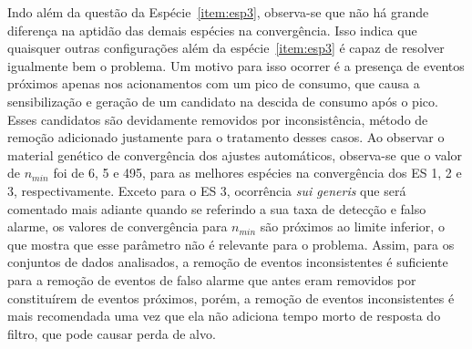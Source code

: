 Indo além da questão da Espécie~\ref{item:esp3}, observa-se que não há
grande diferença na aptidão das demais espécies na convergência. Isso
indica que quaisquer outras configurações além da
espécie~\ref{item:esp3} é capaz de resolver igualmente bem o problema.
Um motivo para isso ocorrer é a presença de eventos próximos apenas
nos acionamentos com um pico de consumo, que causa a sensibilização e
geração de um candidato na descida de consumo após o pico. Esses
candidatos são devidamente removidos por inconsistência, método de
remoção adicionado justamente para o tratamento desses casos. Ao
observar o material genético de convergência dos ajustes automáticos,
observa-se que o valor de $n_{min}$ foi de 6, 5 e 495, para as
melhores espécies na convergência dos ES 1, 2
e 3, respectivamente. Exceto para o ES 3,
ocorrência \emph{sui generis} que será comentado mais adiante quando
se referindo a sua taxa de detecção e falso alarme, os valores de
convergência para $n_{min}$ são próximos ao limite inferior, o que
mostra que esse parâmetro não é relevante para o problema. Assim, para
os conjuntos de dados analisados, a remoção de eventos inconsistentes
é suficiente para a remoção de eventos de falso alarme que antes eram
removidos por constituírem de eventos próximos, porém, a remoção de
eventos inconsistentes é mais recomendada uma vez que ela não adiciona
tempo morto de resposta do filtro, que pode causar perda de alvo.

